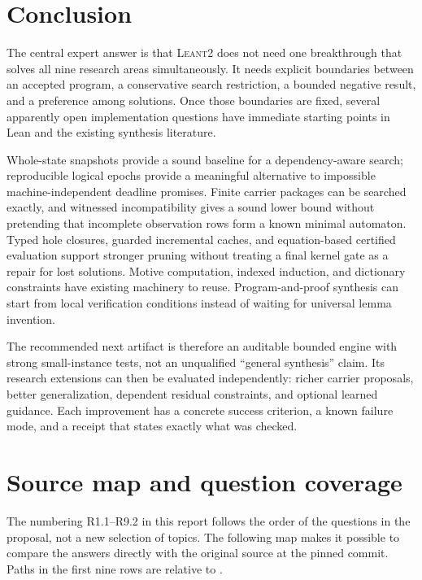 \documentclass[11pt,a4paper]{article}
\newcommand{\repo}{\textsc{Leant2}}
\theoremstyle{definition}
\theoremstyle{remark}
\begin{document}
\section{Conclusion}
\label{sec:conclusion}
The central expert answer is that \repo{} does not need one breakthrough that
solves all nine research areas simultaneously. It needs explicit boundaries
between an accepted program, a conservative search restriction, a bounded
negative result, and a preference among solutions. Once those boundaries are
fixed, several apparently open implementation questions have immediate starting
points in Lean and the existing synthesis literature.

Whole-state snapshots provide a sound baseline for a dependency-aware search;
reproducible logical epochs provide a meaningful alternative to impossible
machine-independent deadline promises. Finite carrier packages can be searched
exactly, and witnessed incompatibility gives a sound lower bound without
pretending that incomplete observation rows form a known minimal automaton.
Typed hole closures, guarded incremental caches, and equation-based certified
evaluation support stronger pruning without treating a final kernel gate as a
repair for lost solutions. Motive computation, indexed induction, and dictionary
constraints have existing machinery to reuse. Program-and-proof synthesis can
start from local verification conditions instead of waiting for universal lemma
invention.

The recommended next artifact is therefore an auditable bounded engine with
strong small-instance tests, not an unqualified ``general synthesis'' claim.
Its research extensions can then be evaluated independently: richer carrier
proposals, better generalization, dependent residual constraints, and optional
learned guidance. Each improvement has a concrete success criterion, a known
failure mode, and a receipt that states exactly what was checked.

\appendix
\section{Source map and question coverage}
The numbering R1.1--R9.2 in this report follows the order of the questions in the
proposal, not a new selection of topics. The following map makes it possible to
compare the answers directly with the original source at the pinned commit.
Paths in the first nine rows are relative to
.
\end{document}
